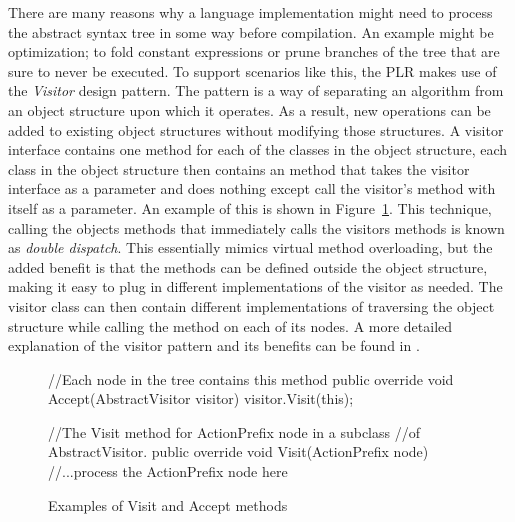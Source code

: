 	There are many reasons why a language implementation might need to process 
	the abstract syntax tree in some way before compilation. An example might be 
	optimization; to fold constant expressions or prune branches of the tree 
	that are sure to never be executed. To support scenarios like this, the PLR 
	makes use of the \textit{Visitor} design pattern. The pattern is a way of 
	separating an algorithm from an object structure upon which it operates. As 
	a result, new operations can be added to existing object structures without 
	modifying those structures. A visitor interface contains one  
	method for each of the classes in the object structure, each class in the 
	object structure then contains an  method that takes the 
	visitor interface as a parameter and does nothing except call the visitor's 
	 method with itself as a parameter. An example of this is 
	shown in Figure~\ref{fig:visitor_example}. This technique, calling the 
	objects  methods that immediately calls the visitors 
	 methods is known as \textit{double dispatch}. This 
	essentially mimics virtual method overloading, but the added benefit is that 
	the methods can be defined outside the object structure, making it easy to 
	plug in different implementations of the visitor as needed. The visitor 
	class can then contain different implementations of traversing the object 
	structure while calling the  method on each of its nodes. A 
	more detailed explanation of the visitor pattern and its benefits 
	can be found in \cite{design_patterns, visitor}.
	
	\begin{figure}
	\begin{csharp}
  
//Each node in the tree contains this method
public override void Accept(AbstractVisitor visitor) {
  visitor.Visit(this);
}
  
//The Visit method for ActionPrefix node in a subclass
//of AbstractVisitor. 
public override void Visit(ActionPrefix node) {
  //...process the ActionPrefix node here
}
\end{csharp}
\caption{Examples of Visit and Accept methods}
\label{fig:visitor_example}
	\end{figure}
  
